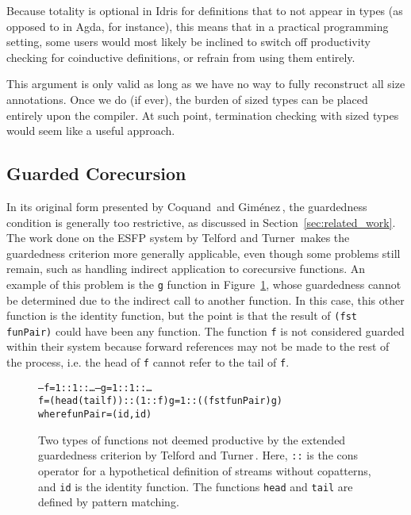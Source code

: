 Because totality is optional in Idris for definitions that to not appear in types (as opposed to in Agda, for instance), this means that in a practical programming setting, some users would most likely be inclined to switch off productivity checking for coinductive definitions, or refrain from using them entirely.

This argument is only valid as long as we have no way to fully reconstruct all size annotations. Once we do (if ever), the burden of sized types can be placed entirely upon the compiler. At such point, termination checking with sized types would seem like a useful approach.

\subsection{Guarded Corecursion}
In its original form presented by Coquand\,\citep{Coquand94} and Gim\'{e}nez\,\citep{Gimenez95}, the guardedness condition is generally too restrictive, as discussed in Section~\ref{sec:related_work}. The work done on the ESFP system by Telford and Turner\,\citep{Telford97ensuringstreams,Telford98ensuringthe} makes the guardedness criterion more generally applicable, even though some problems still remain, such as handling indirect application to corecursive functions. An example of this problem is the \texttt{g} function in Figure~\ref{fig:TelfordTurnerProblems}, whose guardedness cannot be determined due to the indirect call to another function. In this case, this other function is the identity function, but the point is that the result of \texttt{(fst funPair)} could have been any function. The function \texttt{f} is not considered guarded within their system because forward references may not be made to the rest of the process, i.e. the head of \texttt{f} cannot refer to the tail of \texttt{f}.

\begin{figure}
\begin{alltt}
-- f = 1 :: 1 :: \ldots                            -- g = 1 :: 1 :: \ldots
f = (head (tail f)) :: (1 :: f)                 g = 1 :: ((fst funPair) g)
                                                where funPair = (id, id)
\end{alltt}
\caption{Two types of functions not deemed productive by the extended guardedness criterion by Telford and Turner\,\citep[Section~6.3]{Telford98ensuringthe}. Here, \texttt{::} is the cons operator for a hypothetical definition of streams without copatterns, and \texttt{id} is the identity function. The functions \texttt{head} and \texttt{tail} are defined by pattern matching.} 
\label{fig:TelfordTurnerProblems}
\end{figure}

